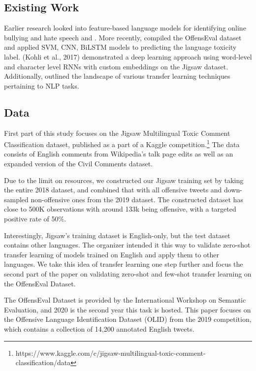 \documentclass[11pt,a4paper]{article}
\begin{document}
\subsection{Existing Work}

Earlier research looked into feature-based language models for identifying online bullying and hate speech \citep{6406271} and \citep{huang}. More recently, \citep{zampierietal2019} compiled the OffensEval dataset and applied SVM, CNN, BiLSTM models to predicting the language toxicity label. (Kohli et al., 2017) demonstrated a deep learning approach using word-level and character level RNNs with custom embeddings on the Jigsaw dataset. Additionally, \citep{ruder-etal-2019-transfer} outlined the landscape of various transfer learning techniques pertaining to NLP tasks.  

\subsection{Data}
First part of this study focuses on the Jigsaw Multilingual Toxic Comment Classification dataset, published as a part of a Kaggle competition.\footnote{https://www.kaggle.com/c/jigsaw-multilingual-toxic-comment-classification/data} The data consists of English comments from Wikipedia’s talk page edits as well as an expanded version of the Civil Comments dataset. 

Due to the limit on resources, we constructed our Jigsaw training set by taking the entire 2018 dataset, and combined that with all offensive tweets and down-sampled non-offensive ones from the 2019 dataset. The constructed dataset has close to 500K observations with around 133k being offensive, with a targeted positive rate of 50\%.

Interestingly, Jigsaw’s training dataset is English-only, but the test dataset contains other languages. The organizer intended it this way to validate zero-shot transfer learning of models trained on English and apply them to other languages. We take this idea of transfer learning one step further and focus the second part of the paper on validating zero-shot and few-shot transfer learning on the OffensEval Dataset.

The OffensEval Dataset is provided by the International Workshop on Semantic Evaluation, and 2020 is the second year this task is hosted. This paper focuses on the Offensive Language Identification Dataset (OLID) from the 2019 competition, which contains a collection of 14,200 annotated English tweets. 
\end{document}
